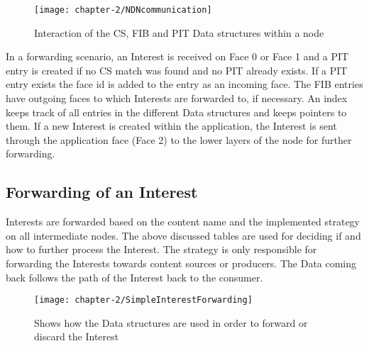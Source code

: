 \vspace{5mm} %

\begin{figure}[H]
  \centering
  \texttt{[image: chapter-2/NDNcommunication]}
  \caption{Interaction of the CS, FIB and PIT Data structures within a node \cite{ndn17}}
  \label{fig:NDNcommunication}
\end{figure}

In a forwarding scenario, an Interest is received on Face 0 or Face 1 and a PIT entry is created if no CS match was found and no PIT already exists. If a PIT entry exists the face id is added to the entry as an incoming face. The FIB entries have outgoing faces to which Interests are forwarded to, if necessary. An index keeps track of all entries in the different Data structures and keeps pointers to them. If a new Interest is created within the application, the Interest is sent through the application face (Face 2) to the lower layers of the node for further forwarding. 

\subsection{Forwarding of an Interest}

Interests are forwarded based on the content name and the implemented strategy on all intermediate nodes. The above discussed tables are used for deciding if and how to further process the Interest. The strategy is only responsible for forwarding the Interests towards content sources or producers. The Data coming back follows the path of the Interest back to the consumer.

\vspace{5mm} %

\begin{figure}[H]
  \centering
  \texttt{[image: chapter-2/SimpleInterestForwarding]}
  \caption{Shows how the Data structures are used in order to forward or discard the Interest \cite{amadeo14}}
  \label{fig:SimpleInterestForwarding}
\end{figure}

\vspace{5mm} %

